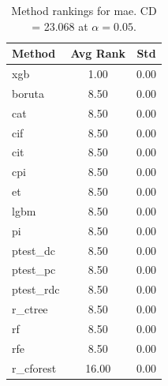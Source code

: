 \begin{table}[h]
\centering
\caption{Method rankings for mae. CD = 23.068 at $\alpha=0.05$.}
\label{tab:ranks_mae}
\begin{tabular}{lcc}
\toprule
Method & Avg Rank & Std \\
\midrule
xgb & 1.00 & 0.00 \\
boruta & 8.50 & 0.00 \\
cat & 8.50 & 0.00 \\
cif & 8.50 & 0.00 \\
cit & 8.50 & 0.00 \\
cpi & 8.50 & 0.00 \\
et & 8.50 & 0.00 \\
lgbm & 8.50 & 0.00 \\
pi & 8.50 & 0.00 \\
ptest_dc & 8.50 & 0.00 \\
ptest_pc & 8.50 & 0.00 \\
ptest_rdc & 8.50 & 0.00 \\
r_ctree & 8.50 & 0.00 \\
rf & 8.50 & 0.00 \\
rfe & 8.50 & 0.00 \\
r_cforest & 16.00 & 0.00 \\
\bottomrule
\end{tabular}
\end{table}